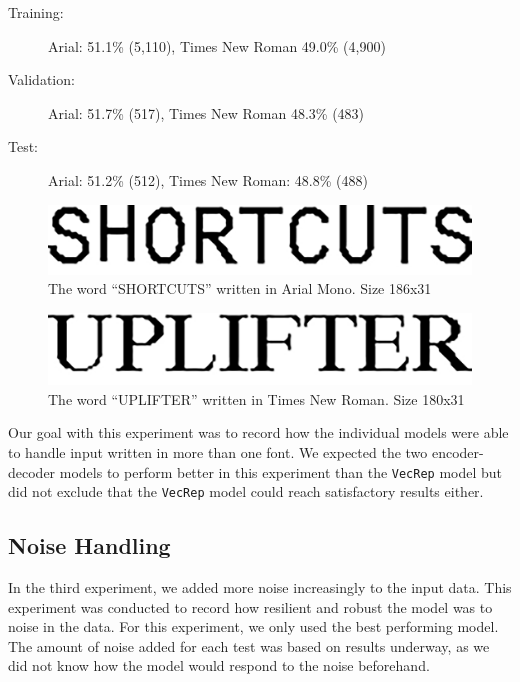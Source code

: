 \vspace{0.5cm}
\begin{minipage}{0.8\linewidth}
    \begin{description}
        \item[Training:]{Arial: 51.1\% (5,110), Times New Roman 49.0\% (4,900)}
        \item[Validation:]{Arial: 51.7\% (517), Times New Roman 48.3\% (483)}
        \item[Test:]{Arial: 51.2\% (512), Times New Roman: 48.8\% (488)}
    \end{description}
\end{minipage}

\begin{figure}[ht]
    \centering
    \includegraphics[width=.8\textwidth]{fig/experiments/SHORTCUTS_dpi.png}
    \captionsetup{justification=centering}
    \caption{The word ``SHORTCUTS'' written in Arial Mono. Size 186x31}
\end{figure}

\begin{figure}[ht]
    \centering
    \includegraphics[width=.8\textwidth]{fig/experiments/UPLIFTER_dpi.png}
    \captionsetup{justification=centering}
    \caption{The word ``UPLIFTER'' written in Times New Roman. Size 180x31}
\end{figure}

Our goal with this experiment was to record how the individual models were able to handle input written in more than one font. We expected the two encoder-decoder models to perform better in this experiment than the {\tt VecRep} model but did not exclude that the {\tt VecRep} model could reach satisfactory results either.

\subsection{Noise Handling}
In the third experiment, we added more noise increasingly to the input data. This experiment was conducted to record how resilient and robust the model was to noise in the data. For this experiment, we only used the best performing model. The amount of noise added for each test was based on results underway, as we did not know how the model would respond to the noise beforehand.

